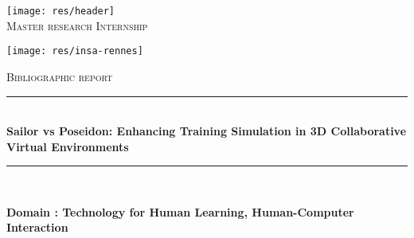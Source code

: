 \documentclass[11pt]{article}
\newcommand{\HRule}{\rule{\linewidth}{0.5mm}}
\begin{document}
\begin{titlepage}

\begin{center}


 

\texttt{[image: res/header]}\\[1cm]
\textsc{\Large Master research Internship}
\vspace{1cm}


\texttt{[image: res/insa-rennes]}

  
\vspace{1cm} 
\textsc{\Large Bibliographic report }\\[0.5cm]


\HRule \\[0.4cm]
{ \Large \bfseries Sailor vs Poseidon: Enhancing Training Simulation in 3D Collaborative Virtual Environments }\\[0.4cm]

\HRule \\[1.5cm]
\begin{flushleft}
\textbf{Domain : Technology for Human Learning, Human-Computer Interaction }
\end{flushleft}


\end{center}
\end{titlepage}
\end{document}
